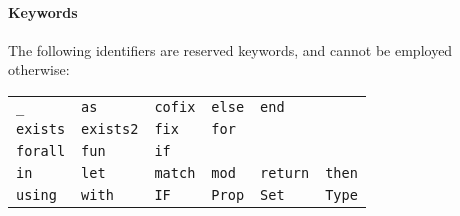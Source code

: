 \paragraph{Keywords}
The following identifiers are reserved keywords, and cannot be
employed otherwise:
\begin{center}
\begin{tabular}{llllll}
\verb!_!          &
\verb!as!         &
\verb!cofix!      &
\verb!else!       &
\verb!end!        \\
\verb!exists!     &
\verb!exists2!    &
\verb!fix!        &
\verb!for!        \\
\verb!forall!     &
\verb!fun!        &
\verb!if!         \\
\verb!in!         &
\verb!let!        &
\verb!match!      &
\verb!mod!        &
\verb!return!     &
\verb!then!       \\
\verb!using!      &
\verb!with!       &
\verb!IF!         &
\verb!Prop!       &
\verb!Set!        &
\verb!Type!       \\
\end{tabular}
\end{center}


